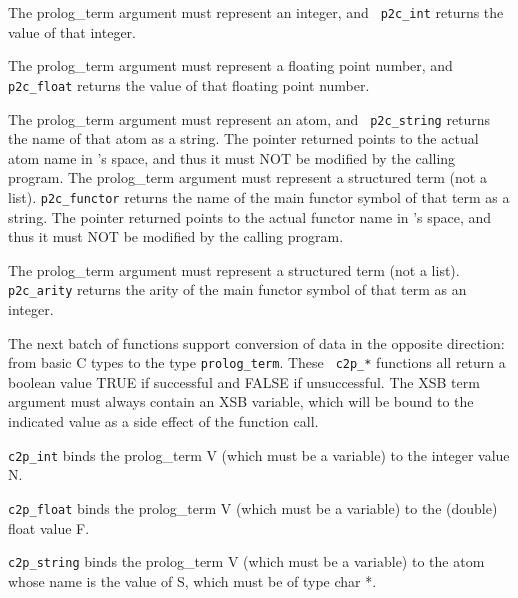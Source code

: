 \begin{description}
 
    The prolog\_term argument must represent an integer, and {\tt
    p2c\_int} returns the value of that integer.

 
    The prolog\_term argument must represent a floating point number,
    and {\tt p2c\_float} returns the value of that floating point
    number.

 
    The prolog\_term argument must represent an atom, and {\tt
    p2c\_string} returns the name of that atom as a string. The
    pointer returned points to the actual atom name in \ourprolog 's
    space, and thus it must NOT be modified by the calling program.
 
    The prolog\_term argument must represent a structured term (not a
    list).  {\tt p2c\_functor} returns the name of the main functor
    symbol of that term as a string. The pointer returned points to
    the actual functor name in \ourprolog 's space, and thus it must
    NOT be modified by the calling program.

 
    The prolog\_term argument must represent a structured term (not a
    list).  {\tt p2c\_arity} returns the arity of the main functor
    symbol of that term as an integer.
\end{description}

The next batch of functions support conversion of data in the opposite
direction: from basic C types to the type {\tt prolog\_term}.  These {\tt
  c2p\_*} functions all return a boolean value TRUE if successful and FALSE
if unsuccessful.  The XSB term argument must always contain an
XSB variable, which will be bound to the indicated value as a side
effect of the function call.

\begin{description}
 
    {\tt c2p\_int} binds the prolog\_term V (which must be a variable)
    to the integer value N.

 
    {\tt c2p\_float} binds the prolog\_term V (which must be a variable)
    to the (double) float value F.

 
    {\tt c2p\_string} binds the prolog\_term V (which must be a
    variable) to the atom whose name is the value of S, which must be
    of type char *.
\end{description}

